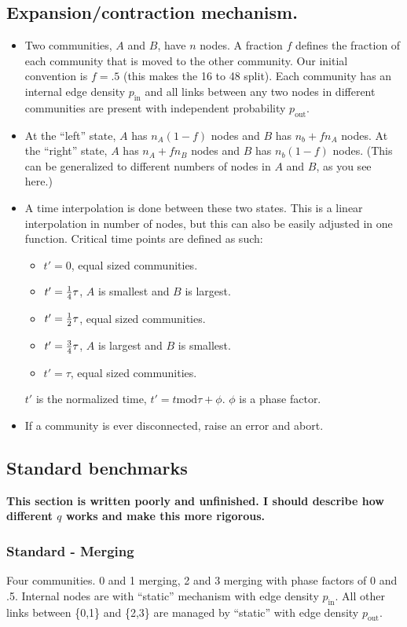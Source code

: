 \documentclass{article}
\def\pin{p_\mathrm{in}}
\def\pout{p_\mathrm{out}}
\begin{document}
\subsection{Expansion/contraction mechanism.}
\begin{itemize}
\item Two communities, $A$ and $B$, have $n$ nodes.  A fraction $f$
  defines the fraction of each community that is moved to the other
  community.  Our initial convention is $f=.5$ (this makes the 16 to
  48 split).  Each community has an
  internal edge density $\pin$ and all links between any two nodes in
  different communities are present with independent probability
  $\pout$.
\item At the ``left'' state, $A$ has $n_A(1-f)$ nodes and $B$ has
  $n_b+f n_A$ nodes.  At the ``right'' state, $A$ has $n_A + f n_B$
  nodes and $B$ has $n_b(1-f)$ nodes.  (This can be generalized to
  different numbers of nodes in $A$ and $B$, as you see here.)
\item A time interpolation is done between these two states.  This is
  a linear interpolation in number of nodes, but this can also be
  easily adjusted in one function.  Critical time points are defined
  as such:
  \begin{itemize}
  \item $t'=0$, equal sized communities.
  \item $t'={1 \over 4} \tau$, $A$ is smallest and $B$ is largest.
  \item $t'={1 \over 2} \tau$, equal sized communities.
  \item $t'={3 \over 4} \tau$, $A$ is largest and $B$ is smallest.
  \item $t'=\tau$, equal sized communities.
  \end{itemize}
  $t'$ is the normalized time, $t' = t \mathrm{mod} \tau + \phi$.  $\phi$ is a
  phase factor.
\item If a community is ever disconnected, raise an error and abort.
\end{itemize}



\subsection{Standard benchmarks}

\textbf{This section is written poorly and unfinished.  I should
  describe how different $q$ works and make this more rigorous.}

\subsubsection{Standard - Merging}
Four communities.  0 and 1 merging, 2 and 3 merging with phase
factors of 0 and .5.  Internal nodes are with ``static'' mechanism with
edge density $\pin$.  All other links between \{0,1\} and \{2,3\} are
managed by ``static'' with edge density $\pout$.
\end{document}
